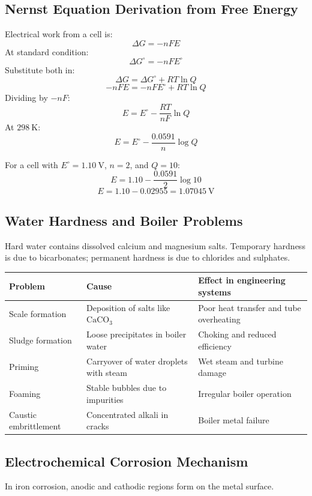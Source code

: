 \documentclass[12pt,a4paper]{article}
\begin{document}
\subsection{Nernst Equation Derivation from Free Energy}
Electrical work from a cell is:
\[
\Delta G=-nFE
\]
At standard condition:
\[
\Delta G^\circ=-nFE^\circ
\]
Substitute both in:
\[
\Delta G=\Delta G^\circ+RT\ln Q
\]
\[
-nFE=-nFE^\circ+RT\ln Q
\]
Dividing by $-nF$:
\[
E=E^\circ-\frac{RT}{nF}\ln Q
\]
At $298\ \mathrm{K}$:
\[
E=E^\circ-\frac{0.0591}{n}\log Q
\]

\begin{tcolorbox}[examplebox, title={Solved Example: Cell Potential}]
For a cell with $E^\circ=1.10\ \mathrm{V}$, $n=2$, and $Q=10$:
\[
E=1.10-\frac{0.0591}{2}\log 10
\]
\[
E=1.10-0.02955=1.07045\ \mathrm{V}
\]
\end{tcolorbox}

\subsection{Water Hardness and Boiler Problems}
Hard water contains dissolved calcium and magnesium salts. Temporary hardness is due to bicarbonates; permanent hardness is due to chlorides and sulphates.

\begin{tabularx}{\linewidth}{|B{3.2cm}|Y|Y|}
\hline
\textbf{Problem} & \textbf{Cause} & \textbf{Effect in engineering systems} \\
\hline
Scale formation & Deposition of salts like $\mathrm{CaCO_3}$ & Poor heat transfer and tube overheating \\
\hline
Sludge formation & Loose precipitates in boiler water & Choking and reduced efficiency \\
\hline
Priming & Carryover of water droplets with steam & Wet steam and turbine damage \\
\hline
Foaming & Stable bubbles due to impurities & Irregular boiler operation \\
\hline
Caustic embrittlement & Concentrated alkali in cracks & Boiler metal failure \\
\hline
\end{tabularx}

\subsection{Electrochemical Corrosion Mechanism}
In iron corrosion, anodic and cathodic regions form on the metal surface.
\end{document}
